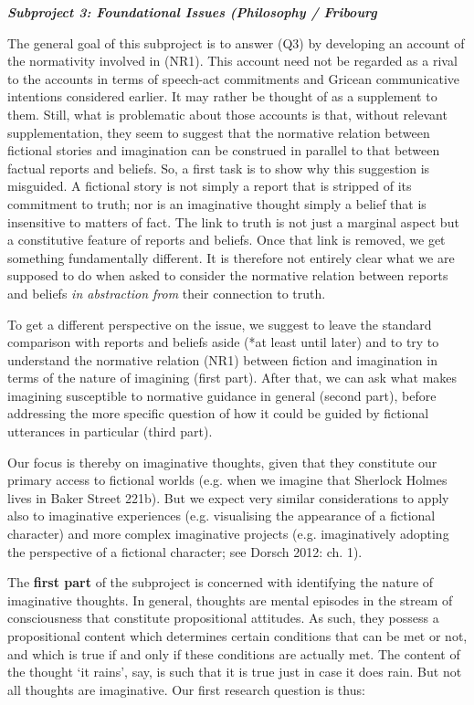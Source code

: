 \vspace{.2cm}
\noindent\textbf{\emph{Subproject 3: Foundational Issues (Philosophy / Fribourg}}
\vspace{.1cm}

\noindent The general goal of this subproject is to answer (Q3) by developing an account of the normativity involved in (NR1). This account need not be regarded as a rival to the accounts in terms of speech-act commitments and Gricean communicative intentions considered earlier. It may rather be thought of as a supplement to them. Still, what is problematic about those accounts is that, without relevant supplementation, they seem to suggest that the normative relation between fictional stories and imagination can be construed in parallel to that between factual reports and beliefs. So, a first task is to show why this suggestion is misguided. A fictional story is not simply a report that is stripped of its commitment to truth; nor is an imaginative thought simply a belief that is insensitive to matters of fact. The link to truth is not just a marginal aspect but a constitutive feature of reports and beliefs. Once that link is removed, we get something fundamentally different. It is therefore not entirely clear what we are supposed to do when asked to consider the normative relation between reports and beliefs \emph{in abstraction from} their connection to truth.

To get a different perspective on the issue, we suggest to leave the standard comparison with reports and beliefs aside (*at least until later) and to try to understand the normative relation (NR1) between fiction and imagination in terms of the nature of imagining (first part). After that, we can ask what makes imagining susceptible to normative guidance in general (second part), before addressing the more specific question of how it could be guided by fictional utterances in particular (third part).

Our focus is thereby on imaginative thoughts, given that they constitute our primary access to fictional worlds (e.g. when we imagine that Sherlock Holmes lives in Baker Street 221b). But we expect very similar considerations to apply also to imaginative experiences (e.g. visualising the appearance of a fictional character) and more complex imaginative projects (e.g. imaginatively adopting the perspective of a fictional character; see Dorsch 2012: ch. 1).

The \textbf{first part} of the subproject is concerned with identifying the nature of imaginative thoughts. In general, thoughts are mental episodes in the stream of consciousness that constitute propositional attitudes. As such, they possess a propositional content which determines certain conditions that can be met or not, and which is true if and only if these conditions are actually met. The content of the thought `it rains', say, is such that it is true just in case it does rain. But not all thoughts are imaginative. Our first research question is thus:

